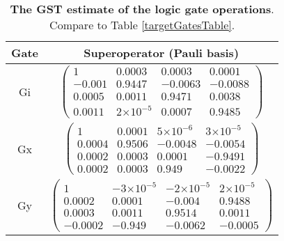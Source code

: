 \documentclass{article}[11pt]
\providecommand{\e}[1]{\ensuremath{\times 10^{#1}}}
\begin{document}
\begin{table}[h]
\begin{center}
\begin{tabular}[l]{|c|c|}
\hline
Gate & Superoperator (Pauli basis) \\ \hline
Gi & $ \left(\!\!\begin{array}{cccc}
1 & 0.0003 & 0.0003 & 0.0001 \\ 
-0.001 & 0.9447 & -0.0063 & -0.0088 \\ 
0.0005 & 0.0011 & 0.9471 & 0.0038 \\ 
0.0011 & 2\e{-5} & 0.0007 & 0.9485
 \end{array}\!\!\right) $
 \\ \hline
Gx & $ \left(\!\!\begin{array}{cccc}
1 & 0.0001 & 5\e{-6} & 3\e{-5} \\ 
0.0004 & 0.9506 & -0.0048 & -0.0054 \\ 
0.0002 & 0.0003 & 0.0001 & -0.9491 \\ 
0.0002 & 0.0003 & 0.949 & -0.0022
 \end{array}\!\!\right) $
 \\ \hline
Gy & $ \left(\!\!\begin{array}{cccc}
1 & -3\e{-5} & -2\e{-5} & 2\e{-5} \\ 
0.0002 & 0.0001 & -0.004 & 0.9488 \\ 
0.0003 & 0.0011 & 0.9514 & 0.0011 \\ 
-0.0002 & -0.949 & -0.0062 & -0.0005
 \end{array}\!\!\right) $
 \\ \hline
\end{tabular}

\caption{\textbf{The GST estimate of the logic gate operations}.  Compare to Table \ref{targetGatesTable}.\label{bestGatesetGatesTable}}
\end{center}
\end{table}
\end{document}
